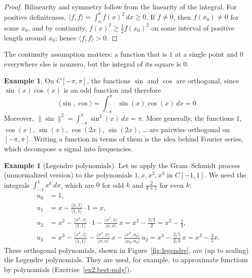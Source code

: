 \documentclass[11pt]{article}
\newcommand{\norm}[1]{\lVert #1 \rVert}
\newcommand{\ip}[2]{\langle #1, #2 \rangle}
\theoremstyle{definition}
\newtheorem{example}[definition]{Example}
\theoremstyle{plain}
\theoremstyle{remark}
\begin{document}
\begin{proof}
    Bilinearity and symmetry follow from the linearity of the integral. For positive definiteness, $\ip{f}{f} = \int_a^b f(x)^2 \, dx \geq 0$. If $f \neq 0$, then $f(x_0) \neq 0$ for some $x_0$, and by continuity, $f(x)^2 \geq \frac{1}{2} f(x_0)^2$ on some interval of positive length around $x_0$; hence $\ip{f}{f} > 0$.
\end{proof}

The continuity assumption matters: a function that is $1$ at a single point and $0$ everywhere else is nonzero, but the integral of its square is $0$.

\begin{example}
    On $C[-\pi, \pi]$, the functions $\sin$ and $\cos$ are orthogonal, since $\sin(x)\cos(x)$ is an odd function and therefore
    \[\ip{\sin}{\cos} = \int_{-\pi}^{\pi} \sin(x) \cos(x) \, dx = 0.\]
    Moreover, $\norm{\sin}^2 = \int_{-\pi}^{\pi} \sin^2(x) \, dx = \pi$. More generally, the functions $1$, $\cos(x)$, $\sin(x)$, $\cos(2x)$, $\sin(2x)$, \ldots{} are pairwise orthogonal on $[-\pi, \pi]$. Writing a function in terms of them is the idea behind Fourier series, which decompose a signal into frequencies.
\end{example}

\begin{example}[Legendre polynomials]\label{ex:legendre}
    Let us apply the Gram--Schmidt process (unnormalized version) to the polynomials $1, x, x^2, x^3$ in $C[-1, 1]$. We need the integrals $\int_{-1}^1 x^k \, dx$, which are $0$ for odd $k$ and $\frac{2}{k + 1}$ for even $k$:
    \begin{align*}
        u_0 &= 1, \\
        u_1 &= x - \frac{\ip{x}{1}}{\ip{1}{1}} \cdot 1 = x, \\
        u_2 &= x^2 - \frac{\ip{x^2}{1}}{\ip{1}{1}} \cdot 1 - \frac{\ip{x^2}{x}}{\ip{x}{x}} \, x = x^2 - \frac{2/3}{2} = x^2 - \frac{1}{3}, \\
        u_3 &= x^3 - \frac{\ip{x^3}{1}}{\ip{1}{1}} - \frac{\ip{x^3}{x}}{\ip{x}{x}} \, x - \frac{\ip{x^3}{u_2}}{\ip{u_2}{u_2}} \, u_2 = x^3 - \frac{2/5}{2/3} \, x = x^3 - \frac{3}{5} x.
    \end{align*}
    These orthogonal polynomials, shown in Figure~\ref{fig:legendre}, are (up to scaling) the Legendre polynomials. They are used, for example, to approximate functions by polynomials (Exercise~\ref{ex2:best-poly}).
\end{example}
\end{document}
